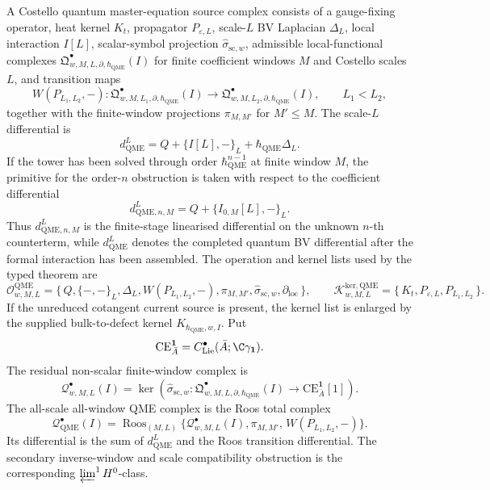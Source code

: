 \begin{defn}
  A Costello quantum master-equation source complex consists of a
  gauge-fixing operator, heat kernel \(K_t\), propagator
  \(P_{\varepsilon,L}\), scale-\(L\) BV Laplacian \(\Delta_L\), local
  interaction \(I[L]\), scalar-symbol projection
  \(\widehat\sigma_{\mathrm{sc},w}\), admissible local-functional
  complexes \(\mathfrak Q^\bullet_{w,M,L,\partial,\hbar_{\mathrm{QME}}}(I)\) for finite
  coefficient windows \(M\) and Costello scales \(L\), and transition
  maps
  \[
    W(P_{L_1,L_2},-)\colon
    \mathfrak Q^\bullet_{w,M,L_1,\partial,\hbar_{\mathrm{QME}}}(I)
    \longrightarrow
    \mathfrak Q^\bullet_{w,M,L_2,\partial,\hbar_{\mathrm{QME}}}(I),
    \qquad L_1<L_2,
  \]
  together with the finite-window projections
  \(\pi_{M,M'}\) for \(M'\le M\).  The scale-\(L\) differential is
  \[
    d_{\mathrm{QME}}^L
    =
    Q+\{I[L],-\}_{L}+\hbar_{\mathrm{QME}}\Delta_L.
  \]
  If the tower has been solved through order
  \(\hbar_{\mathrm{QME}}^{n-1}\) at finite window \(M\), the primitive
  for the order-\(n\) obstruction is taken with respect to the
  coefficient differential
  \[
    d^{L}_{\mathrm{QME},n,M}
    =
    Q+\{I_{0,M}[L],-\}_{L}.
  \]
  Thus \(d^{L}_{\mathrm{QME},n,M}\) is the finite-stage linearised
  differential on the unknown \(n\)-th counterterm, while
  \(d_{\mathrm{QME}}^L\) denotes the completed quantum BV differential
  after the formal interaction has been assembled.
  The operation and kernel lists used by the typed theorem are
  \[
    \mathcal O^{\mathrm{QME}}_{w,M,L}
    =
    \{\,Q,\{-,-\}_{L},\Delta_L,W(P_{L_1,L_2},-),\pi_{M,M'},
      \widehat\sigma_{\mathrm{sc},w},\partial_{\mathrm{loc}}\,\},
    \qquad
    \mathcal K^{\mathrm{ker,QME}}_{w,M,L}
    =
    \{\,K_t,P_{\varepsilon,L},P_{L_1,L_2}\,\}.
  \]
  If the unreduced cotangent current source is present, the kernel list is
  enlarged by the supplied bulk-to-defect kernel
  \(K_{\hbar_{\mathrm{QME}},w,I}\).
  Put
  \[
    \mathrm{CE}_{\bar A}^{\mathbf 1}
    =
    C^\bullet_{\mathrm{Lie}}(\bar A;\C\gamma_{\mathbf 1}).
  \]
  The residual non-scalar finite-window complex is
  \[
    \mathcal Q^\bullet_{w,M,L}(I)
    =
    \ker\!\left(
    \widehat\sigma_{\mathrm{sc},w}\colon
    \mathfrak Q^\bullet_{w,M,L,\partial,\hbar_{\mathrm{QME}}}(I)
    \to \mathrm{CE}_{\bar A}^{\mathbf 1}[1]\right).
  \]
  The all-scale all-window QME complex is the Roos total complex
  \[
    \mathcal Q^\bullet_{\mathrm{QME}}(I)
    =
    \operatorname{Roos}_{(M,L)}
    \bigl\{\mathcal Q^\bullet_{w,M,L}(I),
    \pi_{M,M'},\,W(P_{L_1,L_2},-)\bigr\}.
  \]
  Its differential is the sum of \(d_{\mathrm{QME}}^L\) and the Roos
  transition differential.  The secondary inverse-window and scale
  compatibility obstruction is the corresponding
  \(\varprojlim^1H^0\)-class.


\end{defn}
